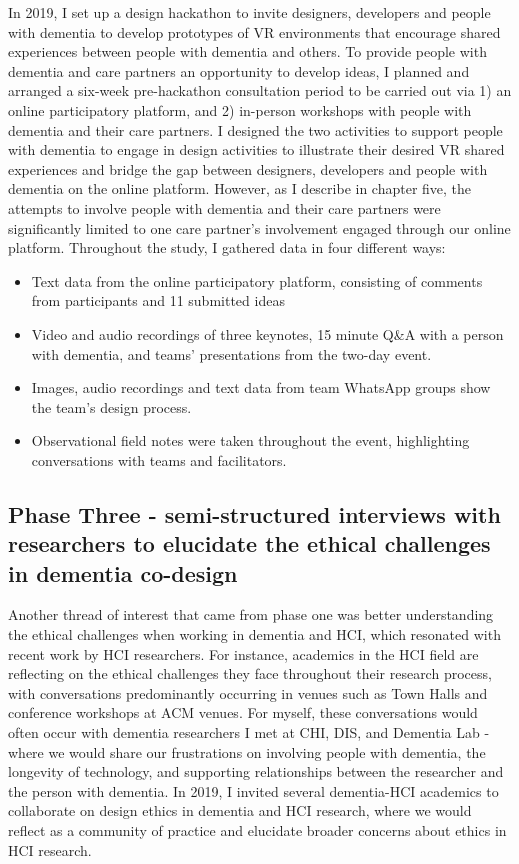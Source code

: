 In 2019, I set up a design hackathon to invite designers, developers and people with dementia to develop prototypes of VR environments that encourage shared experiences between people with dementia and others. To provide people with dementia and care partners an opportunity to develop ideas, I planned and arranged a six-week pre-hackathon consultation period to be carried out via 1) an online participatory platform, and 2) in-person workshops with people with dementia and their care partners. I designed the two activities to support people with dementia to engage in design activities to illustrate their desired VR shared experiences and bridge the gap between designers, developers and people with dementia on the online platform. However, as I describe in chapter five, the attempts to involve people with dementia and their care partners were significantly limited to one care partner's involvement engaged through our online platform. Throughout the study, I gathered data in four different ways:
\begin{itemize}
    \item Text data from the online participatory platform, consisting of comments from participants and 11 submitted ideas
    \item Video and audio recordings of three keynotes, 15 minute Q\&A with a person with dementia, and teams' presentations from the two-day event.
    \item Images, audio recordings and text data from team WhatsApp groups show the team's design process.
    \item Observational field notes were taken throughout the event, highlighting conversations with teams and facilitators.
\end{itemize}

\subsection{Phase Three - semi-structured interviews with researchers to elucidate the ethical challenges in dementia co-design}

Another thread of interest that came from phase one was better understanding the ethical challenges when working in dementia and HCI, which resonated with recent work by HCI researchers. For instance, academics in the HCI field are reflecting on the ethical challenges they face throughout their research process, with conversations predominantly occurring in venues such as Town Halls and conference workshops at ACM venues. For myself, these conversations would often occur with dementia researchers I met at CHI, DIS, and Dementia Lab - where we would share our frustrations on involving people with dementia, the longevity of technology, and supporting relationships between the researcher and the person with dementia. In 2019, I invited several dementia-HCI academics to collaborate on design ethics in dementia and HCI research, where we would reflect as a community of practice and elucidate broader concerns about ethics in HCI research.

